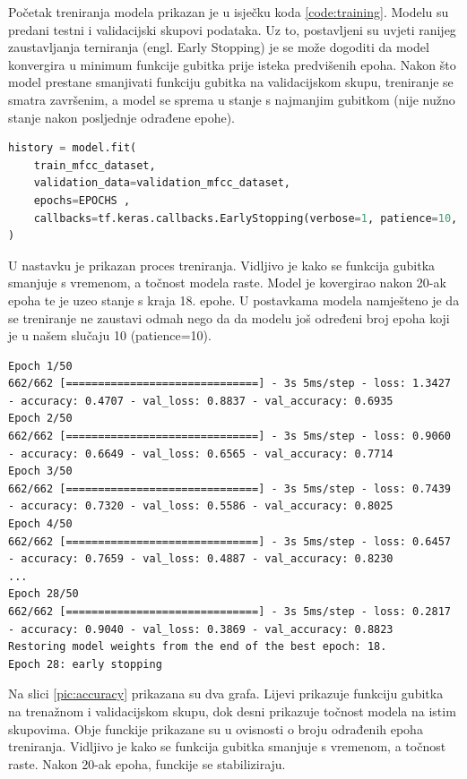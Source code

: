 Početak treniranja modela prikazan je u isječku koda \ref{code:training}. Modelu
su predani testni i validacijski skupovi podataka. Uz to, postavljeni su uvjeti ranijeg
zaustavljanja terniranja (engl. Early Stopping) je se može dogoditi da model
konvergira u minimum funkcije gubitka prije isteka predvišenih epoha. Nakon
što model prestane smanjivati funkciju gubitka na validacijskom skupu, treniranje
se smatra završenim, a model se sprema u stanje s najmanjim gubitkom (nije nužno 
stanje nakon posljednje odrađene epohe).

\begin{lstlisting}[language=Python, caption=Trening, label=code:training]
history = model.fit(
    train_mfcc_dataset,
    validation_data=validation_mfcc_dataset,
    epochs=EPOCHS ,
    callbacks=tf.keras.callbacks.EarlyStopping(verbose=1, patience=10, restore_best_weights=True),
)
\end{lstlisting}

U nastavku je prikazan proces treniranja. Vidljivo je kako se funkcija
gubitka smanjuje s vremenom, a točnost modela raste. Model je kovergirao nakon 20-ak
epoha te je uzeo stanje s kraja 18. epohe. U postavkama modela namješteno je da se
treniranje ne zaustavi odmah nego da da modelu još određeni broj epoha koji je
u našem slučaju 10 (patience=10).

{
\tiny
\begin{verbatim}
Epoch 1/50
662/662 [==============================] - 3s 5ms/step - loss: 1.3427 - accuracy: 0.4707 - val_loss: 0.8837 - val_accuracy: 0.6935
Epoch 2/50
662/662 [==============================] - 3s 5ms/step - loss: 0.9060 - accuracy: 0.6649 - val_loss: 0.6565 - val_accuracy: 0.7714
Epoch 3/50
662/662 [==============================] - 3s 5ms/step - loss: 0.7439 - accuracy: 0.7320 - val_loss: 0.5586 - val_accuracy: 0.8025
Epoch 4/50
662/662 [==============================] - 3s 5ms/step - loss: 0.6457 - accuracy: 0.7659 - val_loss: 0.4887 - val_accuracy: 0.8230
...
Epoch 28/50
662/662 [==============================] - 3s 5ms/step - loss: 0.2817 - accuracy: 0.9040 - val_loss: 0.3869 - val_accuracy: 0.8823
Restoring model weights from the end of the best epoch: 18.
Epoch 28: early stopping
\end{verbatim}
}

Na slici \ref{pic:accuracy} prikazana su dva grafa. Lijevi prikazuje funkciju gubitka
na trenažnom i validacijskom skupu, dok desni prikazuje točnost modela na istim skupovima.
Obje funckije prikazane su u ovisnosti o broju odrađenih epoha treniranja. Vidljivo je
kako se funkcija gubitka smanjuje s vremenom, a točnost raste. Nakon 20-ak epoha, funckije
se stabiliziraju. 

